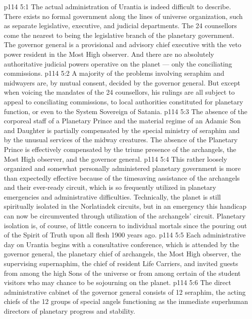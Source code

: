 \vs p114 5:1 The actual administration of Urantia is indeed difficult to describe. There exists no formal government along the lines of universe organization, such as separate legislative, executive, and judicial departments. The 24 counsellors come the nearest to being the legislative branch of the planetary government. The governor general is a provisional and advisory chief executive with the veto power resident in the Most High observer. And there are no absolutely authoritative judicial powers operative on the planet --- only the conciliating commissions.
\vs p114 5:2 A majority of the problems involving seraphim and midwayers are, by mutual consent, decided by the governor general. But except when voicing the mandates of the 24 counsellors, his rulings are all subject to appeal to conciliating commissions, to local authorities constituted for planetary function, or even to the System Sovereign of Satania.
\vs p114 5:3 The absence of the corporeal staff of a Planetary Prince and the material regime of an Adamic Son and Daughter is partially compensated by the special ministry of seraphim and by the unusual services of the midway creatures. The absence of the Planetary Prince is effectively compensated by the triune presence of the archangels, the Most High observer, and the governor general.
\vs p114 5:4 This rather loosely organized and somewhat personally administered planetary government is more than expectedly effective because of the timesaving assistance of the archangels and their ever\hyp{}ready circuit, which is so frequently utilized in planetary emergencies and administrative difficulties. Technically, the planet is still spiritually isolated in the Norlatiadek circuits, but in an emergency this handicap can now be circumvented through utilization of the archangels’ circuit. Planetary isolation is, of course, of little concern to individual mortals since the pouring out of the Spirit of Truth upon all flesh 1900 years ago.
\vs p114 5:5 \pc Each administrative day on Urantia begins with a consultative conference, which is attended by the governor general, the planetary chief of archangels, the Most High observer, the supervising supernaphim, the chief of resident Life Carriers, and invited guests from among the high Sons of the universe or from among certain of the student visitors who may chance to be sojourning on the planet.
\vs p114 5:6 The direct administrative cabinet of the governor general consists of 12 seraphim, the acting chiefs of the 12 groups of special angels functioning as the immediate superhuman directors of planetary progress and stability.
